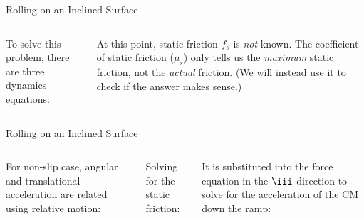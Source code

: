 \documentclass[12pt,compress,aspectratio=169]{beamer}
\begin{document}
\begin{frame}{Rolling on an Inclined Surface}
  \begin{columns}
    

    To solve this problem, there are three dynamics equations:

    \vspace{-.3in}{\large
      \begin{align*}
        \sum F_x&=mg\sin\phi-f_s=ma\\
        \sum F_y&=F_n-mg\cos\phi=0\\
        \sum\tau &=Rf_s=I\alpha
      \end{align*}
    }
    
    At this point, static friction $f_s$ is \emph{not} known. The coefficient
    of static friction ($\mu_s$) only tells us the \emph{maximum} static
    friction, not the \emph{actual} friction. (We will instead use it to check
    if the answer makes sense.)
  \end{columns}
\end{frame}



\begin{frame}{Rolling on an Inclined Surface}
  \begin{columns}
    

    For non-slip case, angular and translational acceleration are related using
    relative motion:

    
    \vspace{-.22in}Solving for the static friction:


    \vspace{-.1in}It is substituted into the force equation in the $\iii$
    direction to solve for the acceleration of the CM down the ramp:

  \end{columns}
\end{frame}
\end{document}
